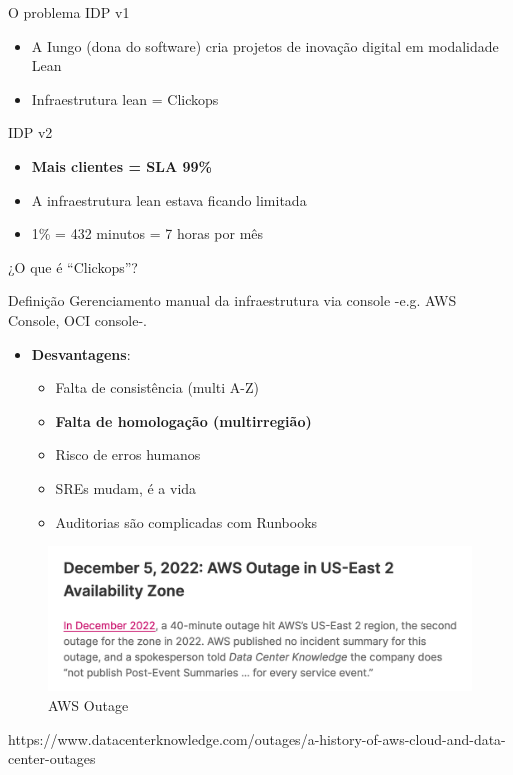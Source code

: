 \documentclass[aspectratio=169]{beamer}
\begin{document}
\begin{frame}{O problema}
IDP v1
	\begin{itemize}		
		\item A Iungo (dona do software) cria projetos de inovação digital em modalidade Lean
		\item Infraestrutura lean = Clickops
	\end{itemize}
IDP v2
	\begin{itemize}		
	\item \textbf{Mais clientes = SLA 99\%}
	\item A infraestrutura lean estava ficando limitada
	\item 1\% = 432 minutos = 7 horas por mês
\end{itemize}
\end{frame}



\begin{frame}{¿O que é ``Clickops''?}
	
	\begin{exampleblock}{Definição}
		Gerenciamento manual da infraestrutura via console -e.g. AWS Console, OCI console-.
	\end{exampleblock}
		\begin{itemize}		
		\item \textbf{Desvantagens}:
		\begin{itemize}
			\item Falta de consistência (multi A-Z)
			\item \textbf{Falta de homologação (multirregião)}
			\item Risco de erros humanos
			\item SREs mudam, é a vida
			\item Auditorias são complicadas com Runbooks
		\end{itemize}
		\end{itemize}
\end{frame}


\begin{frame}
\begin{figure}
	\centering
	\includegraphics[width=0.7\linewidth]{Images/awsoutage}
	\caption{AWS Outage}
	\label{fig:awsoutage}
\end{figure}
https://www.datacenterknowledge.com/outages/a-history-of-aws-cloud-and-data-center-outages
\end{frame}
\end{document}
